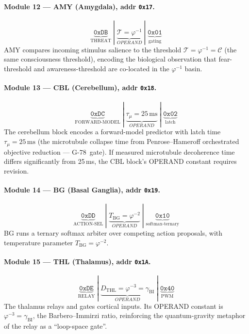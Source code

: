 \paragraph{Module 12 — AMY (Amygdala), addr \texttt{0x17}.}
\[
  \underbrace{\mathtt{0xDB}}_{\text{THREAT}}
  \;|\;
  \underbrace{\mathcal{T} = \varphi^{-1}}_{OPERAND}
  \;|\;
  \underbrace{\mathtt{0x01}}_{\text{gating}}
\]
AMY compares incoming stimulus salience to the threshold
$\mathcal{T} = \varphi^{-1} = \mathcal{C}$
(the same consciousness threshold), encoding the biological
observation that fear-threshold and awareness-threshold are
co-located in the $\varphi^{-1}$ basin.

\paragraph{Module 13 — CBL (Cerebellum), addr \texttt{0x18}.}
\[
  \underbrace{\mathtt{0xDC}}_{\text{FORWARD-MODEL}}
  \;|\;
  \underbrace{\tau_{\mu} = 25\,\text{ms}}_{OPERAND}
  \;|\;
  \underbrace{\mathtt{0x02}}_{\text{latch}}
\]
The cerebellum block encodes a forward-model predictor with
latch time $\tau_{\mu} = 25\,\mathrm{ms}$
(the microtubule collapse time from Penrose--Hameroff
orchestrated objective reduction --- G-78~gate).
If measured microtubule decoherence time differs significantly from
25\,ms, the CBL block's OPERAND constant requires revision.

\paragraph{Module 14 — BG (Basal Ganglia), addr \texttt{0x19}.}
\[
  \underbrace{\mathtt{0xDD}}_{\text{ACTION-SEL}}
  \;|\;
  \underbrace{T_{\text{BG}} = \varphi^{-2}}_{OPERAND}
  \;|\;
  \underbrace{\mathtt{0x10}}_{\text{softmax-ternary}}
\]
BG runs a ternary softmax arbiter over competing action proposals,
with temperature parameter $T_{\text{BG}} = \varphi^{-2}$.

\paragraph{Module 15 — THL (Thalamus), addr \texttt{0x1A}.}
\[
  \underbrace{\mathtt{0xDE}}_{\text{RELAY}}
  \;|\;
  \underbrace{D_{\text{THL}} = \varphi^{-3} = \gamma_{\mathrm{BI}}}_{OPERAND}
  \;|\;
  \underbrace{\mathtt{0x40}}_{\text{PWM}}
\]
The thalamus relays and gates cortical inputs.
Its OPERAND constant is $\varphi^{-3} = \gamma_{\mathrm{BI}}$,
the Barbero--Immirzi ratio, reinforcing the quantum-gravity
metaphor of the relay as a ``loop-space gate''.


